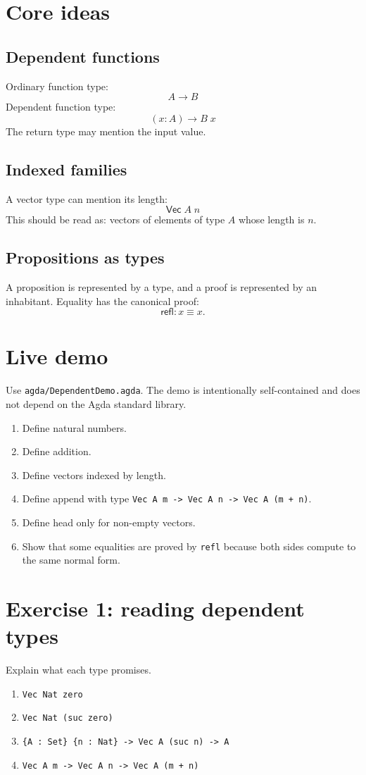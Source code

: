 \documentclass[11pt]{article}
\begin{document}
\section*{Core ideas}
\subsection*{Dependent functions}
Ordinary function type:
\[
  A \to B
\]
Dependent function type:
\[
  (x : A) \to B\;x
\]
The return type may mention the input value.

\subsection*{Indexed families}
A vector type can mention its length:
\[
  \mathsf{Vec}\;A\;n
\]
This should be read as: vectors of elements of type $A$ whose length is $n$.

\subsection*{Propositions as types}
A proposition is represented by a type, and a proof is represented by an inhabitant. Equality has the canonical proof:
\[
  \mathsf{refl} : x \equiv x.
\]

\section*{Live demo}
Use \texttt{agda/DependentDemo.agda}. The demo is intentionally self-contained and does not depend on the Agda standard library.

\begin{enumerate}[nosep]
  \item Define natural numbers.
  \item Define addition.
  \item Define vectors indexed by length.
  \item Define append with type \texttt{Vec A m -> Vec A n -> Vec A (m + n)}.
  \item Define head only for non-empty vectors.
  \item Show that some equalities are proved by \texttt{refl} because both sides compute to the same normal form.
\end{enumerate}

\section*{Exercise 1: reading dependent types}
Explain what each type promises.
\begin{enumerate}
  \item \texttt{Vec Nat zero}
  \item \texttt{Vec Nat (suc zero)}
  \item \texttt{\{A : Set\} \{n : Nat\} -> Vec A (suc n) -> A}
  \item \texttt{Vec A m -> Vec A n -> Vec A (m + n)}
\end{enumerate}
\end{document}
